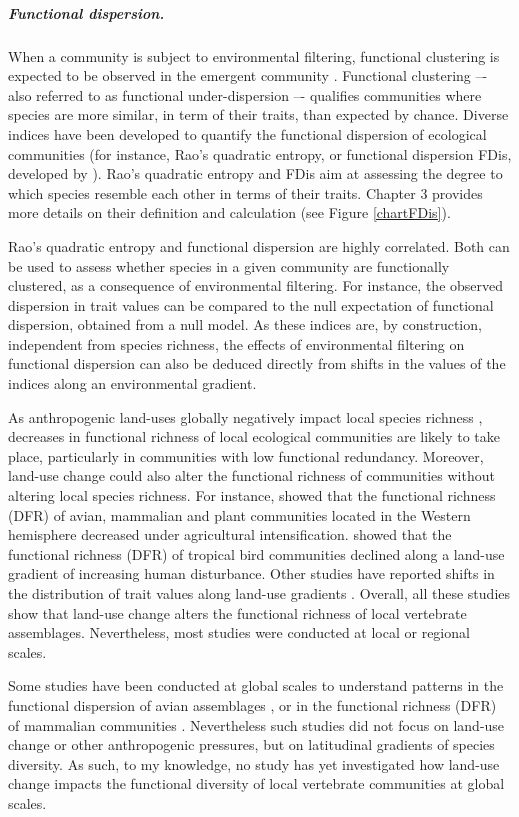 \subparagraph{Functional dispersion.}
When a community is subject to environmental filtering, functional clustering is expected to be observed in the emergent community \citep{Wong2018, Cadotte2017}. Functional clustering –- also referred to as functional under-dispersion –- qualifies communities where species are more similar, in term of their traits, than expected by chance. Diverse indices have been developed to quantify the functional dispersion of ecological communities (for instance, Rao’s quadratic entropy, or functional dispersion FDis, developed by \citet{Laliberte2010}). Rao’s quadratic entropy and FDis aim at assessing the degree to which species resemble each other in terms of their traits. Chapter 3 provides more details on their definition and calculation (see Figure \ref{chartFDis}). 

Rao’s quadratic entropy and functional dispersion are highly correlated. Both can be used to assess whether species in a given community are functionally clustered, as a consequence of environmental filtering. For instance, the observed dispersion in trait values can be compared to the null expectation of functional dispersion, obtained from a null model. As these indices are, by construction, independent from species richness, the effects of environmental filtering on functional dispersion can also be deduced directly from shifts in the values of the indices along an environmental gradient. 

As anthropogenic land-uses globally negatively impact local species richness \citep{Newbold2015}, decreases in functional richness of local ecological communities are likely to take place, particularly in communities with low functional redundancy. Moreover, land-use change could also alter the functional richness of communities without altering local species richness. For instance, \citet{Flynn2009} showed that the functional richness (DFR) of avian, mammalian and plant communities located in the Western hemisphere decreased under agricultural intensification. \citet{Chapman2018} showed that the functional richness (DFR) of tropical bird communities declined along a land-use gradient of increasing human disturbance. Other studies have reported shifts in the distribution of trait values along land-use gradients \citep{LaSorte2018, Rapacciuolo2017}. Overall, all these studies show that land-use change alters the functional richness of local vertebrate assemblages. Nevertheless, most studies were conducted at local or regional scales.

Some studies have been conducted at global scales to understand patterns in the functional dispersion of avian assemblages \citep{Cooke2019}, or in the functional richness (DFR) of mammalian communities \citep{Safi2011}. Nevertheless such studies did not focus on land-use change or other anthropogenic pressures, but on latitudinal gradients of species diversity. As such, to my knowledge, no study has yet investigated how land-use change impacts the functional diversity of local vertebrate communities at global scales. 

